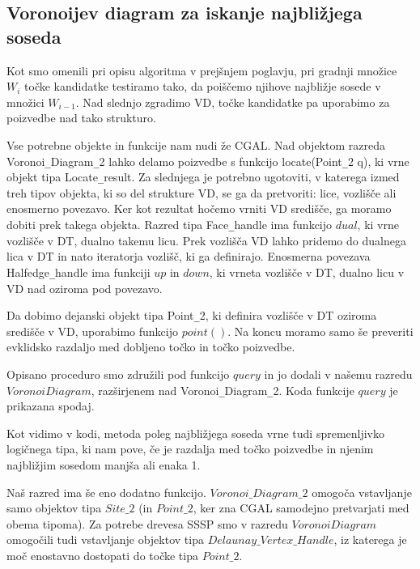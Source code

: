 \documentclass[a4paper, 12pt]{book}
\begin{document}
\subsection{Voronoijev diagram za iskanje najbližjega soseda}

Kot smo omenili pri opisu algoritma v prejšnjem poglavju, pri gradnji množice $W_i$ točke kandidatke testiramo tako, da poiščemo njihove najbližje sosede v množici $W_{i-1}$. Nad slednjo zgradimo VD, točke kandidatke pa uporabimo za poizvedbe nad tako strukturo.

Vse potrebne objekte in funkcije nam nudi že CGAL. Nad objektom razreda Voronoi\texttt{\_}Diagram\texttt{\_}2 lahko delamo poizvedbe s funkcijo locate(Point\texttt{\_}2 q), ki vrne objekt tipa Locate\texttt{\_}result. Za slednjega je potrebno ugotoviti, v katerega izmed treh tipov objekta, ki so del strukture VD, se ga da pretvoriti: lice, vozlišče ali enosmerno povezavo. Ker kot rezultat hočemo vrniti VD središče, ga moramo dobiti prek takega objekta. Razred tipa Face\texttt{\_}handle ima funkcijo $dual$, ki vrne vozlišče v DT, dualno takemu licu. Prek vozlišča VD lahko pridemo do dualnega lica v DT in nato iteratorja vozlišč, ki ga definirajo. Enosmerna povezava Halfedge\texttt{\_}handle ima funkciji $up$ in $down$, ki vrneta vozlišče v DT, dualno licu v VD nad oziroma pod povezavo.

Da dobimo dejanski objekt tipa Point\texttt{\_}2, ki definira vozlišče v DT oziroma središče v VD, uporabimo funkcijo $point()$. Na koncu moramo samo še preveriti evklidsko razdaljo med dobljeno točko in točko poizvedbe.

Opisano proceduro smo združili pod funkcijo $query$ in jo dodali v našemu razredu $VoronoiDiagram$, razširjenem nad Voronoi\texttt{\_}Diagram\texttt{\_}2. Koda funkcije $query$ je prikazana spodaj.



Kot vidimo v kodi, metoda poleg najbližjega soseda vrne tudi spremenljivko logičnega tipa, ki nam pove, če je razdalja med točko poizvedbe in njenim najbližjim sosedom manjša ali enaka 1. 

Naš razred ima še eno dodatno funkcijo. $Voronoi\texttt{\_}Diagram\texttt{\_}2$ omogoča vstavljanje samo objektov tipa $Site\texttt{\_}2$ (in $Point\texttt{\_}2$, ker zna CGAL samodejno pretvarjati med obema tipoma). Za potrebe drevesa SSSP smo v razredu $VoronoiDiagram$ omogočili tudi vstavljanje objektov tipa $Delaunay\texttt{\_}Vertex\texttt{\_}Handle$, iz katerega je moč enostavno dostopati do točke tipa $Point\texttt{\_}2$.
\end{document}
